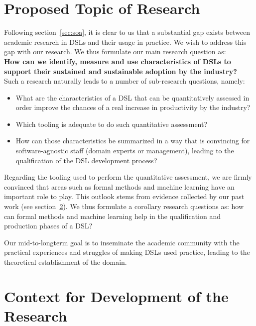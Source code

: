 \documentclass{scrartcl}
\begin{document}
\section{Proposed Topic of Research} 
\label{sec:topic}

Following section~\ref{sec:soa}, it is clear to us that a
substantial gap exists between academic research in DSLs and their usage in
practice. We wish to address this gap with our research. We thus
formulate our main research question as:\\

\textbf{How can we identify, measure and use characteristics of DSLs to support
their sustained and sustainable adoption by the industry?}\\

Such a research naturally leads to a number of sub-research questions, namely:

\begin{itemize}
  \item What are the characteristics of a DSL that can be quantitatively
  assessed in order improve the chances of a real increase in productivity by
  the industry?
  \item Which tooling is adequate to do such quantitative assessment?
  \item How can those characteristics be summarized in a way that is convincing
  for software-agnostic staff (domain experts or management), leading to the
  qualification of the DSL development process?
\end{itemize}

Regarding the tooling used to perform the quantitative assessment, we are firmly
convinced that areas such as formal methods and machine learning have an
important role to play. This outlook stems from evidence collected 
by our past work (see section~\ref{sec:context4dev}). We thus formulate a
 corollary research questions as: how can formal methods and machine learning help
in the qualification and production phases of a DSL?

Our mid-to-longterm goal is to inseminate the academic community with
the practical experiences and struggles of making DSLs used practice, leading
to the theoretical establishment of the domain.

\section{Context for Development of the Research}
\label{sec:context4dev}
\end{document}
